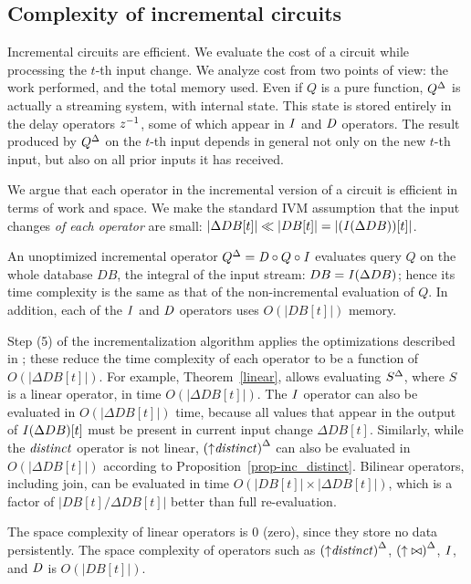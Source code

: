 \subsection{Complexity of incremental circuits}\label{sec:complexity}

Incremental circuits are efficient.  We evaluate the cost of a circuit while processing the
$t$-th input change.  We analyze cost from two points of view: the work performed, and the total memory used.
Even if $Q$ is a pure function, ${Q}^{\Delta}$ is actually a streaming system, with internal state.
This state is stored entirely in the delay operators $z^{-1}$, some of which appear in $\mathit{I}$ and $\mathit{D}$ operators.
The result produced by ${Q}^{\Delta}$ on the $t$-th input depends in general not only on the new
$t$-th input, but also on all prior inputs it has received.

We argue that each operator in the incremental version of a circuit is efficient in
terms of work and space.  We make the standard IVM assumption that the input changes \emph{of each operator} 
are small: $|\Delta DB[t]| \ll |DB[t]| = |(\mathit{I}(\Delta DB))[t]|$.  

An unoptimized incremental operator ${Q}^{\Delta} = \mathit{D} \circ Q \circ \mathit{I}$
evaluates query $Q$ on the whole database $DB$, the integral of the input stream: 
$DB = \mathit{I}(\Delta DB)$; hence its time complexity  is the same as that of the non-incremental 
evaluation of $Q$.  In addition, each of the $\mathit{I}$ and $\mathit{D}$ operators uses $O(|DB[t]|)$ memory.

Step (5) of the incrementalization algorithm applies the optimizations described in ;
these reduce the time complexity of each operator to be a function of $O(|\Delta DB[t]|)$.  
For example, Theorem~\ref{linear}, allows evaluating ${S}^{\Delta}$, where $S$ is a
linear operator, in time $O(|\Delta DB[t]|)$.  The $\mathit{I}$
operator can also be evaluated in $O(|\Delta DB[t]|)$ time, because 
all values that appear in the output of $\mathit{I}(\Delta DB)[t]$ must be present in
current input change $\Delta DB[t]$.  Similarly, while the $\mathit{distinct}$ operator is not
linear, ${({\uparrow}\mathit{distinct})}^{\Delta}$ can also be evaluated in $O(|\Delta DB[t]|)$ according to
Proposition~\ref{prop-inc_distinct}.  Bilinear operators, including join, can be
evaluated in time $O(|DB[t]| \times |\Delta DB[t]|)$, which is a factor of $|DB[t] / \Delta DB[t]|$ 
better than full re-evaluation.

The space complexity of linear operators is 0 (zero), since they store no
data persistently.  The space complexity of operators such as ${({\uparrow}\mathit{distinct})}^{\Delta}$, 
${({\uparrow}\bowtie)}^{\Delta}$, $\mathit{I}$, and $\mathit{D}$ is $O(|DB[t]|)$. 

%